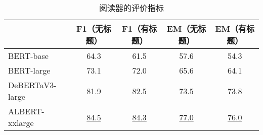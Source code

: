 \begin{table}[htbp]
    \centering
    \caption{阅读器的评价指标}
    \begin{tabular}{lcccc}
    \hline
    & F1（无标题） & F1（有标题） & EM（无标题） & EM（有标题） \\
    \hline
    BERT-base & 64.3 & 61.5 & 57.6 & 54.3 \\
    BERT-large & 73.1 & 72.0 & 65.6 & 64.1 \\
    DeBERTaV3-large & 81.9 & 82.5 & 73.5 & 73.8 \\
    ALBERT-xxlarge & \underline{84.5} & \underline{84.3} & \underline{77.0} & \underline{76.0} \\
    \hline
    \end{tabular}
    \label{tab:5-6}
\end{table}
